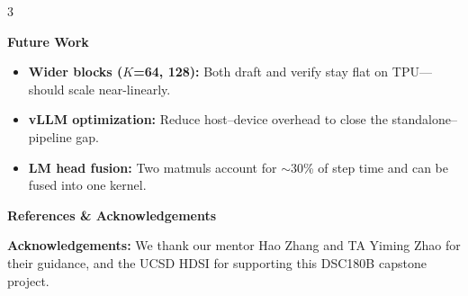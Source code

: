 \documentclass[12pt]{article}
\newcommand{\posterbody}{\fontsize{24}{29}\selectfont}
\newcommand{\postersmall}{\fontsize{20}{25}\selectfont}
\newcommand{\posteritem}{\fontsize{22}{27}\selectfont}
\newcommand{\postersection}{\fontsize{32}{38}\selectfont}
\newcommand{\postersubsection}{\fontsize{26}{31}\selectfont}
\newcommand{\posterblock}[1]{%
  \vspace{6pt}%
  \noindent\colorbox{panelbg}{\parbox{\dimexpr\linewidth-2\fboxsep}{%
    \vspace{3pt}\centering\color{navy}\bfseries\postersection #1\vspace{3pt}}}%
  \vspace{3pt}\par\nobreak%
}
\begin{document}
\begin{multicols*}{3}
\vspace{2pt}
{\postersubsection\bfseries\color{navy} Future Work\par}\vspace{1pt}
\posteritem
\begin{itemize}\setlength\itemsep{3pt}
  \item \textbf{Wider blocks ($K$=64, 128):} Both draft and verify stay flat
        on TPU---should scale near-linearly.
  \item \textbf{vLLM optimization:} Reduce host--device overhead to close the
        standalone--pipeline gap.
  \item \textbf{LM head fusion:} Two matmuls account for $\sim$30\% of step
        time and can be fused into one kernel.
\end{itemize}

\posterblock{References \& Acknowledgements}

\postersmall
\nocite{*}



\vspace{3pt}
\posterbody
\textbf{Acknowledgements:}
We thank our mentor Hao Zhang and TA Yiming Zhao for their guidance,
and the UCSD HDSI for supporting this DSC180B capstone project.

\end{multicols*}
\end{document}
